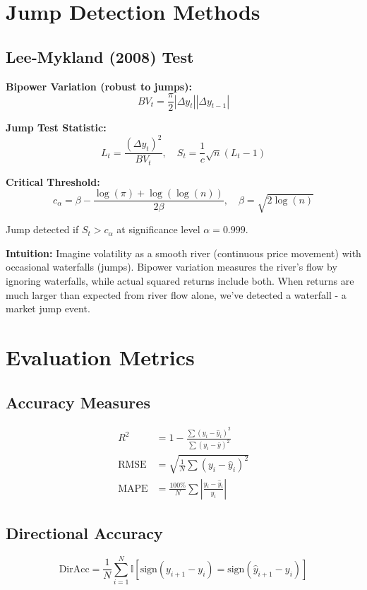 \documentclass{article}
\begin{document}
\section{Jump Detection Methods}

\subsection{Lee-Mykland (2008) Test}
\textbf{Bipower Variation (robust to jumps):}
\begin{equation}
BV_t = \frac{\pi}{2} \left|\Delta y_t\right| \left|\Delta y_{t-1}\right|
\end{equation}

\textbf{Jump Test Statistic:}
\begin{equation}
L_t = \frac{(\Delta y_t)^2}{BV_t}, \quad S_t = \frac{1}{c}\sqrt{n} (L_t - 1)
\end{equation}

\textbf{Critical Threshold:}
\begin{equation}
c_\alpha = \beta - \frac{\log(\pi) + \log(\log(n))}{2\beta}, \quad \beta = \sqrt{2\log(n)}
\end{equation}

Jump detected if $S_t > c_\alpha$ at significance level $\alpha = 0.999$.

\textbf{Intuition:} Imagine volatility as a smooth river (continuous price movement) with occasional waterfalls (jumps). Bipower variation measures the river's flow by ignoring waterfalls, while actual squared returns include both. When returns are much larger than expected from river flow alone, we've detected a waterfall - a market jump event.

\section{Evaluation Metrics}

\subsection{Accuracy Measures}
\begin{align}
R^2 &= 1 - \frac{\sum(y_i - \hat{y}_i)^2}{\sum(y_i - \bar{y})^2} \\
\text{RMSE} &= \sqrt{\frac{1}{N}\sum(y_i - \hat{y}_i)^2} \\
\text{MAPE} &= \frac{100\%}{N}\sum\left|\frac{y_i - \hat{y}_i}{y_i}\right|
\end{align}

\subsection{Directional Accuracy}
\begin{equation}
\text{DirAcc} = \frac{1}{N}\sum_{i=1}^{N} \mathbb{I}[\text{sign}(y_{i+1} - y_i) = \text{sign}(\hat{y}_{i+1} - y_i)]
\end{equation}
\end{document}
